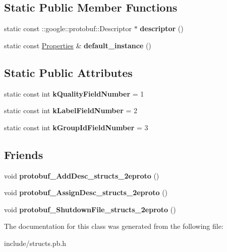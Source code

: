 \subsection*{Static Public Member Functions}
\begin{DoxyCompactItemize}
\item 
\hypertarget{classstruct_definitions_1_1_properties_a6d909cca77847def88f1f6c4e802514e}{}\label{classstruct_definitions_1_1_properties_a6d909cca77847def88f1f6c4e802514e} 
static const \+::google\+::protobuf\+::\+Descriptor $\ast$ {\bfseries descriptor} ()
\item 
\hypertarget{classstruct_definitions_1_1_properties_a211298cc31a0ba4469696485c9fb7716}{}\label{classstruct_definitions_1_1_properties_a211298cc31a0ba4469696485c9fb7716} 
static const \hyperlink{classstruct_definitions_1_1_properties}{Properties} \& {\bfseries default\+\_\+instance} ()
\end{DoxyCompactItemize}
\subsection*{Static Public Attributes}
\begin{DoxyCompactItemize}
\item 
\hypertarget{classstruct_definitions_1_1_properties_a2bfe463b50b4d9568f64d131cf15a4de}{}\label{classstruct_definitions_1_1_properties_a2bfe463b50b4d9568f64d131cf15a4de} 
static const int {\bfseries k\+Quality\+Field\+Number} = 1
\item 
\hypertarget{classstruct_definitions_1_1_properties_a7d907ff80b343989c7f85d0d866313ee}{}\label{classstruct_definitions_1_1_properties_a7d907ff80b343989c7f85d0d866313ee} 
static const int {\bfseries k\+Label\+Field\+Number} = 2
\item 
\hypertarget{classstruct_definitions_1_1_properties_a32fd848e1d146be99c00a2c3785b8d66}{}\label{classstruct_definitions_1_1_properties_a32fd848e1d146be99c00a2c3785b8d66} 
static const int {\bfseries k\+Group\+Id\+Field\+Number} = 3
\end{DoxyCompactItemize}
\subsection*{Friends}
\begin{DoxyCompactItemize}
\item 
\hypertarget{classstruct_definitions_1_1_properties_abcf9b7cc173b6d79696d01156751b8ce}{}\label{classstruct_definitions_1_1_properties_abcf9b7cc173b6d79696d01156751b8ce} 
void {\bfseries protobuf\+\_\+\+Add\+Desc\+\_\+structs\+\_\+2eproto} ()
\item 
\hypertarget{classstruct_definitions_1_1_properties_adb32752ff5178cb902966da6e3cb3bc6}{}\label{classstruct_definitions_1_1_properties_adb32752ff5178cb902966da6e3cb3bc6} 
void {\bfseries protobuf\+\_\+\+Assign\+Desc\+\_\+structs\+\_\+2eproto} ()
\item 
\hypertarget{classstruct_definitions_1_1_properties_ac2e4278d7604361fa6502b1cfbf9d980}{}\label{classstruct_definitions_1_1_properties_ac2e4278d7604361fa6502b1cfbf9d980} 
void {\bfseries protobuf\+\_\+\+Shutdown\+File\+\_\+structs\+\_\+2eproto} ()
\end{DoxyCompactItemize}


The documentation for this class was generated from the following file\+:\begin{DoxyCompactItemize}
\item 
include/structs.\+pb.\+h\end{DoxyCompactItemize}

